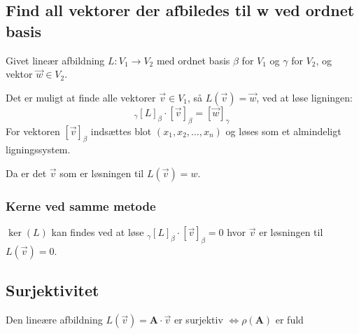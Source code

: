 \subsection{Find all vektorer der afbiledes til w ved ordnet basis}
Givet lineær afbildning \(L: V_1 \to V_2\) med ordnet basis \(\beta\) for \(V_1\) og \(\gamma\) for \(V_2\), og vektor \(\vec{w} \in V_2\).

Det er muligt at finde alle vektorer \(\vec{v} \in V_1\), så \(L(\vec{v}) = \vec{w}\), ved at løse ligningen:
\[
_\gamma [L]_\beta \cdot [\vec{v}]_\beta = [\vec{w}]_\gamma
\]
For vektoren \([\vec{v}]_\beta\) indsættes blot \((x_1, x_2, \ldots, x_n)\) og løses som et almindeligt ligningssystem.

Da er det $\vec{v}$ som er løsningen til $L(\vec{v}) = w$.

\subsubsection{Kerne ved samme metode}
$\ker(L)$ kan findes ved at løse 
\(_\gamma [L]_\beta \cdot [\vec v]_\beta = 0\)
hvor $\vec v$ er løsningen til $L(\vec{v}) = 0$.

\subsection{Surjektivitet}

Den lineære afbildning $L(\vec{v}) = \mathbf{A} \cdot \vec{v}$ er surjektiv $\iff \rho(\mathbf{A})$ er fuld 